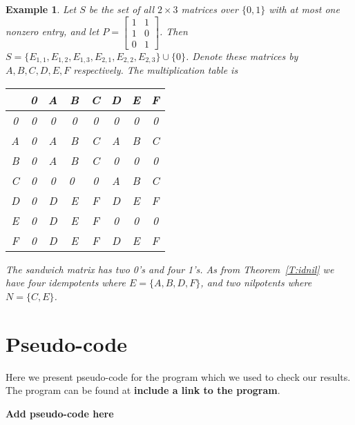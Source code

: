 \documentclass[12pt]{amsart}
\theoremstyle{plain}
\newtheorem{example}[theorem]{Example}
\theoremstyle{definition}
\begin{document}

\begin {example}
	\emph{Let $S$ be the set of all $2 \times 3$ matrices over $\{0, 1\} $ with at most one nonzero entry, and let $P = \begin {bmatrix} 1 &1 \\1 &0\\0 &1  \end {bmatrix}$. Then $S = \{E_{1,1}, E_{1,2}, E_{1, 3}, E_{2,1}, E_{2,2}, E_{2,3}\} \cup \{0\}$.  Denote these matrices by $A, B, C, D, E,  F$ respectively. The multiplication table is  }


\begin {center}
\begin {tabular} {c| c c c c c c c}
$\ $ &0 &A &B &C &D &E &F\\
\hline
0 &0 &0 &0 &0 &0 &0 &0  \\
A &0 &A &B &C &A &B &C\\
B &0 &A &B &C &0 &0 &0\\
C &0 &0 &0\ &0 &A &B &C\\
D &0 &D &E &F &D &E &F\\
E &0 &D &E &F &0 &0 &0\\
F &0 &D &E &F &D &E &F
\end {tabular}
\end {center}


\noindent \emph{The sandwich matrix has two 0's and four 1's. As from Theorem~\ref{T:idnil} we have four idempotents where $E = \{A, B, D, F\}$, and two nilpotents where $N = \{C, E\}$}.
\end {example}

\section {Pseudo-code}

Here we present pseudo-code for the program which we used to check our results. The program can be found at \textbf {include a link to the program}.

\textbf {Add pseudo-code here}

\end{document}
